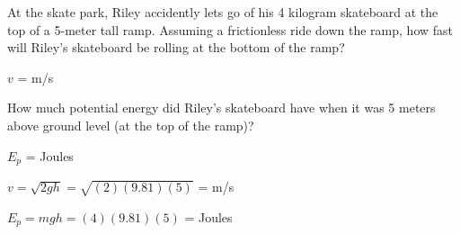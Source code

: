 

At the skate park, Riley accidently lets go of his 4 kilogram skateboard at the top of a 5-meter tall ramp.  Assuming a frictionless ride down the ramp, how fast will Riley's skateboard be rolling at the bottom of the ramp?

\vskip 10pt

$v$ = \underbar{\hskip 50pt} m/s

\vskip 10pt

How much potential energy did Riley's skateboard have when it was 5 meters above ground level (at the top of the ramp)?

\vskip 10pt

$E_p$ = \underbar{\hskip 50pt} Joules










$v = \sqrt{2 g h} = \sqrt{(2)(9.81)(5)}$ =  m/s

\vskip 10pt

$E_p = mgh = (4)(9.81)(5)$ =  Joules











